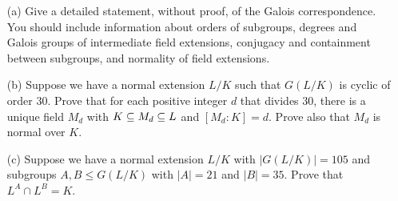 \documentclass[a4paper]{article}
\begin{document}
\begin{problem}%
 \begin{itemize}
  \item[(a)] Give a detailed statement, without proof, of the Galois
   correspondence.  You should include information about orders of
   subgroups, degrees and Galois groups of intermediate field
   extensions, conjugacy and containment between subgroups, and
   normality of field extensions.  
  \item[(b)] Suppose we have a normal extension $L/K$ such that
   $G(L/K)$ is cyclic of order $30$.  Prove that for each positive
   integer $d$ that divides $30$, there is a unique field $M_d$ with
   $K\subseteq M_d\subseteq L$ and $[M_d:K]=d$.  Prove also that $M_d$ is normal
   over $K$. 
  \item[(c)] Suppose we have a normal extension $L/K$ with $|G(L/K)|=105$
   and subgroups $A,B\leq G(L/K)$ with $|A|=21$ and $|B|=35$.  Prove
   that $L^A\cap L^B=K$. 
 \end{itemize}
\end{problem}
\end{document}
